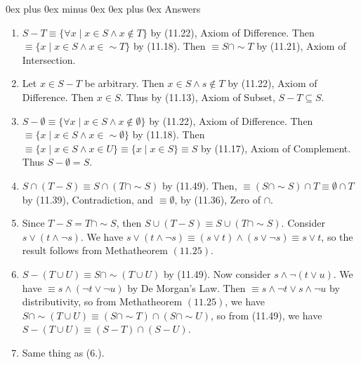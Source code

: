 \documentclass[letterpaper, 8pt]{extarticle}
\makeatletter
\renewcommand{\subsubsection}{\@startsection{subsubsection}{3}{0mm}%
                                {0ex plus 0ex minus 0ex}%
                                {0ex plus 0ex}%
                                {\normalfont\tiny\bfseries}}
\makeatother
\begin{document}
\begin{multicols*}{3}
    \subsubsection{Answers}
    \begin{enumerate}
        \item
              $S - T \equiv \{\forall x \mid x \in S \land x \notin T\}$ by (11.22), Axiom of
              Difference. Then $\equiv \{x \mid x \in S \land x \in \sim T \}$ by (11.18). Then
              $\equiv S \cap \sim T$ by (11.21), Axiom of Intersection.
        \item
              Let $x \in S - T$ be arbitrary. Then $x \in S \land s \notin T$ by (11.22), Axiom
              of Difference. Then $x \in S$. Thus by (11.13), Axiom of Subset, $S - T \subseteq S$.
        \item
              $S - \emptyset \equiv \{\forall x \mid x \in S \land x \notin \emptyset\}$ by (11.22),
              Axiom of Difference. Then $\equiv \{x \mid x \in S \land x \in \sim \emptyset \}$ by
              (11.18). Then $\equiv \{x \mid x \in S \land x \in U \} \equiv \{x \mid x \in S \}
                  \equiv S$ by (11.17), Axiom of Complement. Thus $S - \emptyset = S$.
        \item
              $S \cap (T - S) \equiv S \cap (T \cap \sim S)$ by (11.49). Then, $\equiv (S \cap \sim
                  S) \cap T \equiv \emptyset \cap T$ by (11.39), Contradiction, and $\equiv \emptyset$,
              by (11.36), Zero of $\cap$.
        \item
              Since $T - S = T \cap \sim S$, then $S \cup (T - S) \equiv S \cup (T \cap \sim S)$.
              Consider $s \lor (t \land \lnot s)$. We have $s \lor (t \land \lnot s) \equiv (s \lor t)
                  \land (s \lor \lnot s) \equiv s \lor t$, so the result follows from Methatheorem $(11.25)$.
        \item
              $S - (T \cup U) \equiv S \cap \sim(T \cup U)$ by (11.49). Now consider
              $s \land \lnot (t \lor u)$. We have $\equiv s \land (\lnot t \lor \lnot u)$ by De Morgan's
              Law. Then $\equiv s \land \lnot t \lor s \land \lnot u$ by distributivity, so from
              Methatheorem $(11.25)$, we have $S \cap \sim (T \cup U) \equiv (S \cap \sim T) \cap
                  (S \cap \sim U)$, so from (11.49), we have $S - (T \cup U) \equiv (S - T) \cap (S - U)$.
        \item
              Same thing as (6.).
    \end{enumerate}


\end{multicols*}
\end{document}
